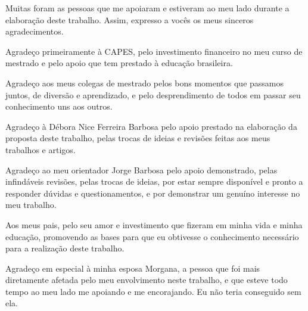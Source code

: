 %
%
\capa
\folhaderosto
\folhadeaprovacao

%
% 

%
%
\begin{agradecimentos}
Muitas foram as pessoas que me apoiaram e estiveram ao meu lado durante a elaboração deste trabalho. Assim, expresso a vocês os meus sinceros agradecimentos.

Agradeço primeiramente à CAPES, pelo investimento financeiro no meu curso de mestrado e pelo apoio que tem prestado à educação brasileira.

Agradeço aos meus colegas de mestrado pelos bons momentos que passamos juntos, de diversão e aprendizado, e pelo desprendimento de todos em passar seu conhecimento uns aos outros.

Agradeço à Débora Nice Ferreira Barbosa pelo apoio prestado na elaboração da proposta deste trabalho, pelas trocas de ideias e revisões feitas aos meus trabalhos e artigos.

Agradeço ao meu orientador Jorge Barbosa pelo apoio demonstrado, pelas infindáveis revisões, pelas trocas de ideias, por estar sempre disponível e pronto a responder dúvidas e questionamentos, e por demonstrar um genuíno interesse no meu trabalho.

Aos meus pais, pelo seu amor e investimento que fizeram em minha vida e minha educação, promovendo as bases para que eu obtivesse o conhecimento necessário para a realização deste trabalho.

Agradeço em especial à minha esposa Morgana, a pessoa que foi mais diretamente afetada pelo meu envolvimento neste trabalho, e que esteve todo tempo ao meu lado me apoiando e me encorajando. Eu não teria conseguido sem ela.

\end{agradecimentos}

